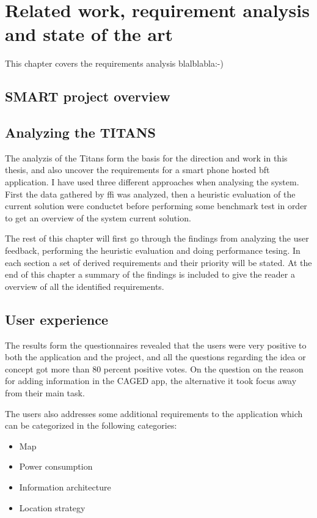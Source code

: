 \chapter{Related work, requirement analysis and state of the art}\label{chap:analysis}
This chapter covers the requirements analysis blalblabla:-)

\section{SMART project overview}
\section{Analyzing the TITANS}\label{sec:smart_analysis}
The analyzis of the Titans form the basis for the direction and work in this thesis, and also uncover the requirements for a smart phone hosted \gls{bft} application. I have used three different approaches when analysing the system. First the data gathered by \gls{ffi} was analyzed, then a heuristic evaluation of the current solution were conductet before performing some benchmark test in order to get an overview of the system current solution. 

The rest of this chapter will first go through the findings from analyzing the user feedback, performing the heuristic evaluation and doing performance tesing. In each section a set of derived requirements and their priority will be stated. At the end of this chapter a summary of the findings is included to give the reader a overview of all the identified requirements.

\section{User experience}
The results form the questionnaires revealed that the users were very positive to both the application and the project, and all the questions regarding the idea or concept got more than 80 percent positive votes. On the question on the reason for adding information in the CAGED app, the alternative it took focus away from their main task.

The users also addresses some additional requirements to the application which can be categorized in the following categories:
\begin{itemize}
	\item{Map}
	\item{Power consumption}
	\item{Information architecture}
	\item{Location strategy}
\end{itemize}

